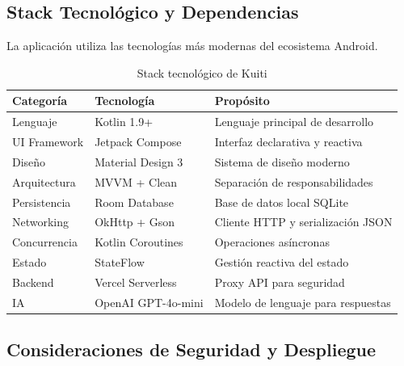 \vspace{1em}
\subsection{Stack Tecnológico y Dependencias}
\label{subsec:stack_tecnologico}

La aplicación utiliza las tecnologías más modernas del ecosistema Android.

\begin{table}[h!]
\centering
\caption{Stack tecnológico de Kuiti}
\label{tab:stack_tecnologico}
\renewcommand{\arraystretch}{1.3}
\begin{tabular}{@{}p{3.5cm}p{3.5cm}p{7cm}@{}}
\toprule
\textbf{Categoría} & \textbf{Tecnología} & \textbf{Propósito} \\
\midrule
Lenguaje & Kotlin 1.9+ & Lenguaje principal de desarrollo \\
\midrule
UI Framework & Jetpack Compose & Interfaz declarativa y reactiva \\
\midrule
Diseño & Material Design 3 & Sistema de diseño moderno \\
\midrule
Arquitectura & MVVM + Clean & Separación de responsabilidades \\
\midrule
Persistencia & Room Database & Base de datos local SQLite \\
\midrule
Networking & OkHttp + Gson & Cliente HTTP y serialización JSON \\
\midrule
Concurrencia & Kotlin Coroutines & Operaciones asíncronas \\
\midrule
Estado & StateFlow & Gestión reactiva del estado \\
\midrule
Backend & Vercel Serverless & Proxy API para seguridad \\
\midrule
IA & OpenAI GPT-4o-mini & Modelo de lenguaje para respuestas \\
\bottomrule
\end{tabular}
\end{table}

\vspace{1em}
\subsection{Consideraciones de Seguridad y Despliegue}
\label{subsec:seguridad_despliegue}

